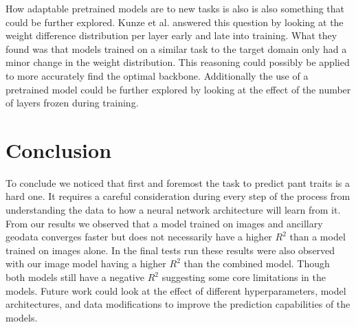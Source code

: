 \documentclass[12pt,a4paper,oneside]{article}
\begin{document}
How adaptable pretrained models are to new tasks is also is also something that could be further explored. Kunze et al. \cite{kunze2017transfer} answered this question by looking at the weight difference distribution per layer early and late into training. What they found was that models trained on a similar task to the target domain only had a minor change in the weight distribution. This reasoning could possibly be applied to more accurately find the optimal backbone. Additionally the use of a pretrained model could be further explored by looking at the effect of the number of layers frozen during training. 

\section{Conclusion}
To conclude we noticed that first and foremost the task to predict pant traits is a hard one. It requires a careful consideration during every step of the process from understanding the data to how a neural network architecture will learn from it. From our results we observed that a model trained on images and ancillary geodata converges faster but does not necessarily have a higher $R^2$ than a model trained on images alone. In the final tests run these results were also observed with our image model having a higher $R^2$ than the combined model. Though both models still have a negative $R^2$ suggesting some core limitations in the models. Future work could look at the effect of different hyperparameters, model architectures, and data modifications to improve the prediction capabilities of the models.   

\printbibliography
\end{document}
